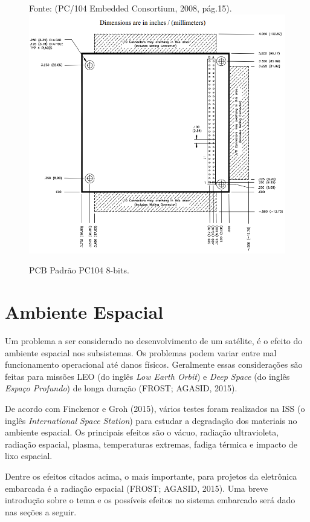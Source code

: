\begin{figure}[h]
	\centering
	Fonte: (PC/104 Embedded Consortium, 2008, pág.15).\linebreak	
	\includegraphics[keepaspectratio=true,scale=0.55]{figuras/pc104.PNG}
	\caption{ PCB Padrão PC104 8-bits.}
	\label{fig16}
\end{figure}
\FloatBarrier

\section{Ambiente Espacial}
Um problema a ser considerado no desenvolvimento de um satélite, é o efeito do ambiente espacial nos subsistemas. Os problemas podem variar entre mal funcionamento operacional até danos físicos. Geralmente essas considerações são feitas para missões LEO (do inglês \textit{Low Earth Orbit}) e \textit{Deep Space} (do inglês \textit{Espaço Profundo}) de longa duração (FROST; AGASID, 2015).

De acordo com Finckenor e Groh (2015), vários testes foram realizados na ISS (o inglês \textit{International Space Station}) para estudar a degradação dos materiais no ambiente espacial. Os principais efeitos são o vácuo, radiação ultravioleta, radiação espacial, plasma, temperaturas extremas, fadiga térmica e impacto de lixo espacial. 

Dentre os efeitos citados acima, o mais importante, para projetos da eletrônica embarcada é a radiação espacial (FROST; AGASID, 2015). Uma breve introdução sobre o tema e os possíveis efeitos no sistema embarcado será dado nas seções a seguir.

